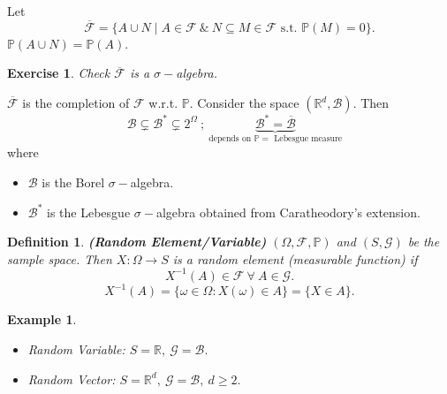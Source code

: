 \documentclass{article}
\newcommand{\1}{\mathds{1}}
\newcommand{\R}{\mathbb{R}}
\newcommand{\F}{\mathcal{F}}
\newcommand{\B}{\mathcal{B}}
\newcommand{\G}{\mathcal{G}}
\newcommand{\PB}{\mathbb{P}}
\newcommand{\st}{\text{ s.t. }}
\newtheorem{definition}[theorem]{Definition}
\newtheorem{example}{Example}
\newtheorem{exercise}{Exercise}
\begin{document}
Let $$\overline{\F}=\{A\cup N\mid A\in\F\ \&\ N\subseteq M\in\F\st \PB(M)=0\}.$$ $\PB(A\cup N)=\PB(A).$
\begin{exercise}
    Check $\overline{\F}$ is a $\sigma-$algebra.
\end{exercise}
$\overline{\F}$ is the completion of $\F$ w.r.t. $\PB$. Consider the space $(\R^d,\B).$ Then
\[
\quad 
\B \subsetneq 
\B^* \subsetneq 
2^{\Omega}\ ;\ 
\underbrace{\B^* = \overline{\B}}_{\text{depends on }\PB=\text{ Lebesgue measure}}\ 
\]
where \begin{itemize}
    \item $\B$ is the Borel $\sigma-$algebra.
    \item $\B^*$ is the Lebesgue $\sigma-$algebra obtained from Caratheodory's extension.
\end{itemize}
\begin{definition}\textbf{(Random Element/Variable)}
    $(\Omega,\F,\PB)$ and $(S,\G)$ be the sample space. Then $X:\Omega\to S$ is a random element (measurable function) if $$X^{-1}(A)\in\F\ \forall\ A\in\G.$$ $$X^{-1}(A)=\{\omega\in\Omega:X(\omega)\in A\}=\{X\in A\}.$$
\end{definition}
\begin{example}
    \begin{itemize}
        \item Random Variable: $S=\R,\ \G=\B.$
        \item Random Vector: $S=\R^d,\ \G=\B,\ d\geq 2.$
    \end{itemize}
\end{example}
\end{document}
